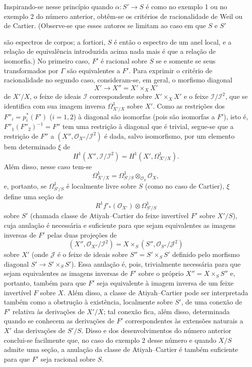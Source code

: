 \documentclass[11pt,twoside,openany]{book}
\numberwithin{equation}{section}
\newcommand{\src}[1]{%
  \phantomsection\hypertarget{src:#1}{}%
  \marginpar{\raggedleft\footnotesize\sffamily #1}%
}
\theoremstyle{plain}
\theoremstyle{definition}
\theoremstyle{remark}
\newcommand{\FgaUnitKey}{frontmatter}
\renewcommand{\src}[1]{%
  \phantomsection\hypertarget{src:\FgaUnitKey:#1}{}%
  \marginpar{\raggedleft\footnotesize\sffamily #1}%
}
\begin{document}
Inspirando-se nesse princípio quando $\alpha:S'\longrightarrow S$ é como no
exemplo 1 ou no exemplo 2 do número anterior, obtêm-se os critérios de
racionalidade de Weil ou de Cartier. (Observe-se que esses autores se limitam ao
caso em que $S$ e $S'$

\src{323}
são espectros de corpos; a fortiori, $S$ é então o espectro de um anel
local, e a relação de equivalência introduzida acima nada mais é que a relação
de isomorfia.) No primeiro caso, $F'$ é racional sobre $S$ se e somente se seus
transformados por $\Gamma$ são equivalentes a $F'$. Para exprimir o critério
de racionalidade no segundo caso, consideram-se, em geral, o morfismo
diagonal
\[
  X'\longrightarrow X''=X'\times_XX'
\]
de $X'/X$, o feixe de ideais $\mathcal I$ correspondente sobre
$X'\times_XX'$ e o feixe $\mathcal I/\mathcal I^2$, que se identifica com sua
imagem inversa $\Omega^1_{X'/X}$ sobre $X'$. Como as restrições dos
$F''_i=p_i^*(F')$ ($i=1,2$) à diagonal são isomorfas (pois são isomorfas a
$F'$), isto é, $F''_1(F''_2)^{-1}=F''$ tem uma restrição à diagonal
que é trivial, segue-se que a restrição de $F''$ a
$(X'',\mathcal O_{X''}/\mathcal I^2)$ é dada, salvo isomorfismo, por um
elemento bem determinado $\xi$ de
\[
  H^1(X'',\mathcal I/\mathcal I^2)
  =H^1(X',\Omega^1_{X'/X}).
\]
Além disso, nesse caso tem-se
\[
  \Omega^1_{X'/X}
  =\Omega^1_{S'/S}\otimes_{\mathcal O_S}\mathcal O_X,
\]
e, portanto, se $\Omega^1_{S'/S}$ é localmente livre sobre $S$ (como no
caso de Cartier), $\xi$ define uma seção de
\[
  R^1f'_*(\mathcal O_{X'})\otimes\Omega^1_{S'/S}
\]
sobre $S'$ (chamada classe de Atiyah--Cartier do feixe invertível $F'$ sobre
$X'/S$), cuja anulação é necessária e suficiente para que sejam equivalentes
as imagens inversas de $F'$ pelas duas projeções de
\[
  (X'',\mathcal O_{X''}/\mathcal I^2)
  =X\times_S(S'',\mathcal O_{S''}/\mathcal J^2)
\]
sobre $X'$ (onde $\mathcal J$ é o feixe de ideais sobre
$S''=S'\times_SS'$ definido pelo morfismo diagonal
$S'\longrightarrow S'\times_SS'$). Essa anulação é, pois, trivialmente
necessária para que sejam equivalentes as imagens inversas de $F'$ sobre o
próprio $X''=X\times_SS''$ e, portanto, também para que $F'$ seja equivalente
à imagem inversa de um feixe invertível $F$ sobre $X$. Além disso, a classe de
Atiyah--Cartier pode ser interpretada também como a obstrução à existência,
localmente sobre $S'$, de uma conexão de $F'$ relativa às derivações de
$X'/X$; tal conexão fica, além disso, determinada quando se conhecem as
derivações de $F'$ correspondentes às extensões naturais a $X'$ das
derivações de $S'/S$. Disso e dos desenvolvimentos do número anterior
conclui-se facilmente que, no caso do exemplo 2 desse número e quando $X/S$
admite uma seção, a anulação da classe de Atiyah--Cartier é também
suficiente para que $F'$ seja racional sobre $S$.
\end{document}

